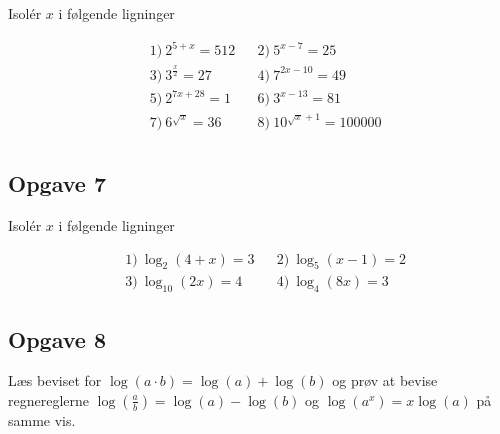 Isolér $x$ i følgende ligninger

\begin{align*}
	&1) \  2^{5+x} = 512 &    &2) \  5^{x-7} = 25 \\
	&3) \  3^{\frac{x}{2}} = 27 &    &4) \  7^{2x-10} = 49 \\
	&5) \  2^{7x+28} = 1 &    &6) \  3^{x-13} = 81 \\
	&7) \  6^{\sqrt{x}} = 36 &    &8) \  10^{\sqrt{x}+1} = 100000 \\
\end{align*}

\subsection*{Opgave 7}

Isolér $x$ i følgende ligninger

\begin{align*}
	&1) \  \log_2(4+x) = 3 &    &2) \  \log_5(x-1) = 2 \\
	&3) \  \log_{10}(2x) = 4 &    &4) \  \log_4(8x) = 3 
\end{align*}

\subsection*{Opgave 8}

Læs beviset for $\log(a\cdot b) = \log(a) + \log(b)$ og prøv at bevise regnereglerne $\log(\frac{a}{b}) =
\log(a)-\log(b)$ og $\log(a^x) = x\log(a)$ på samme vis. 
